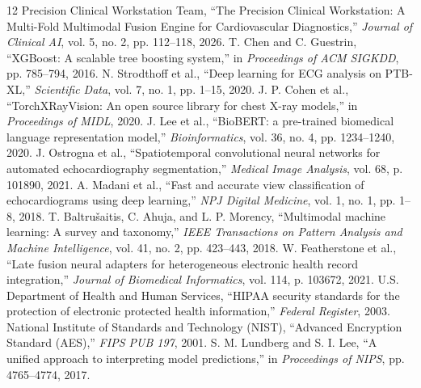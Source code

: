 \documentclass[11pt,onecolumn]{article}
\begin{document}
\begin{thebibliography}{12}
 Precision Clinical Workstation Team, ``The Precision Clinical Workstation: A Multi-Fold Multimodal Fusion Engine for Cardiovascular Diagnostics,'' \textit{Journal of Clinical AI}, vol. 5, no. 2, pp. 112--118, 2026.
 T. Chen and C. Guestrin, ``XGBoost: A scalable tree boosting system,'' in \textit{Proceedings of ACM SIGKDD}, pp. 785--794, 2016.
 N. Strodthoff et al., ``Deep learning for ECG analysis on PTB-XL,'' \textit{Scientific Data}, vol. 7, no. 1, pp. 1--15, 2020.
 J. P. Cohen et al., ``TorchXRayVision: An open source library for chest X-ray models,'' in \textit{Proceedings of MIDL}, 2020.
 J. Lee et al., ``BioBERT: a pre-trained biomedical language representation model,'' \textit{Bioinformatics}, vol. 36, no. 4, pp. 1234--1240, 2020.
 J. Ostrogna et al., ``Spatiotemporal convolutional neural networks for automated echocardiography segmentation,'' \textit{Medical Image Analysis}, vol. 68, p. 101890, 2021.
 A. Madani et al., ``Fast and accurate view classification of echocardiograms using deep learning,'' \textit{NPJ Digital Medicine}, vol. 1, no. 1, pp. 1--8, 2018.
 T. Baltru\v{s}aitis, C. Ahuja, and L. P. Morency, ``Multimodal machine learning: A survey and taxonomy,'' \textit{IEEE Transactions on Pattern Analysis and Machine Intelligence}, vol. 41, no. 2, pp. 423--443, 2018.
 W. Featherstone et al., ``Late fusion neural adapters for heterogeneous electronic health record integration,'' \textit{Journal of Biomedical Informatics}, vol. 114, p. 103672, 2021.
 U.S. Department of Health and Human Services, ``HIPAA security standards for the protection of electronic protected health information,'' \textit{Federal Register}, 2003.
 National Institute of Standards and Technology (NIST), ``Advanced Encryption Standard (AES),'' \textit{FIPS PUB 197}, 2001.
 S. M. Lundberg and S. I. Lee, ``A unified approach to interpreting model predictions,'' in \textit{Proceedings of NIPS}, pp. 4765--4774, 2017.
\end{thebibliography}
\end{document}
